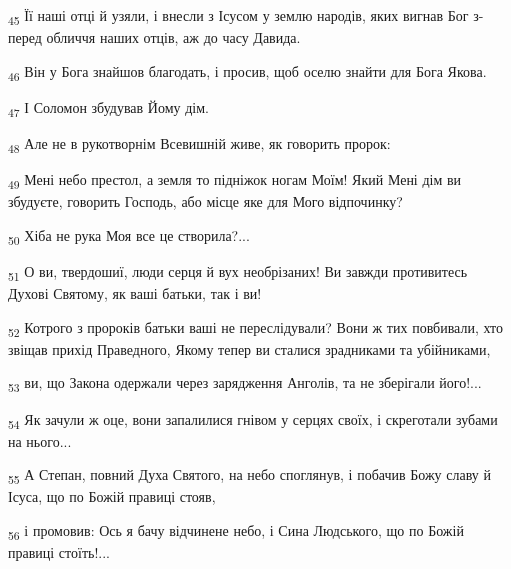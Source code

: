 \begin{tcolorbox}
\textsubscript{45} Її наші отці й узяли, і внесли з Ісусом у землю народів, яких вигнав Бог з-перед обличчя наших отців, аж до часу Давида.
\end{tcolorbox}
\begin{tcolorbox}
\textsubscript{46} Він у Бога знайшов благодать, і просив, щоб оселю знайти для Бога Якова.
\end{tcolorbox}
\begin{tcolorbox}
\textsubscript{47} І Соломон збудував Йому дім.
\end{tcolorbox}
\begin{tcolorbox}
\textsubscript{48} Але не в рукотворнім Всевишній живе, як говорить пророк:
\end{tcolorbox}
\begin{tcolorbox}
\textsubscript{49} Мені небо престол, а земля то підніжок ногам Моїм! Який Мені дім ви збудуєте, говорить Господь, або місце яке для Мого відпочинку?
\end{tcolorbox}
\begin{tcolorbox}
\textsubscript{50} Хіба не рука Моя все це створила?...
\end{tcolorbox}
\begin{tcolorbox}
\textsubscript{51} О ви, твердошиї, люди серця й вух необрізаних! Ви завжди противитесь Духові Святому, як ваші батьки, так і ви!
\end{tcolorbox}
\begin{tcolorbox}
\textsubscript{52} Котрого з пророків батьки ваші не переслідували? Вони ж тих повбивали, хто звіщав прихід Праведного, Якому тепер ви сталися зрадниками та убійниками,
\end{tcolorbox}
\begin{tcolorbox}
\textsubscript{53} ви, що Закона одержали через зарядження Анголів, та не зберігали його!...
\end{tcolorbox}
\begin{tcolorbox}
\textsubscript{54} Як зачули ж оце, вони запалилися гнівом у серцях своїх, і скреготали зубами на нього...
\end{tcolorbox}
\begin{tcolorbox}
\textsubscript{55} А Степан, повний Духа Святого, на небо споглянув, і побачив Божу славу й Ісуса, що по Божій правиці стояв,
\end{tcolorbox}
\begin{tcolorbox}
\textsubscript{56} і промовив: Ось я бачу відчинене небо, і Сина Людського, що по Божій правиці стоїть!...
\end{tcolorbox}
